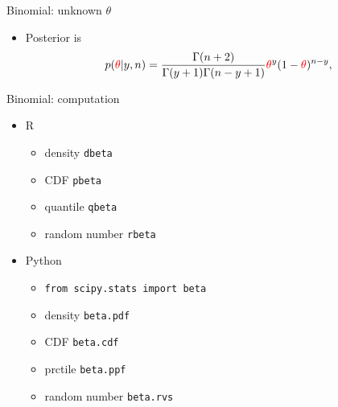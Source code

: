 \documentclass[english,t]{beamer}
\begin{document}

\begin{frame}{Binomial: unknown $\theta$}

  \begin{itemize}
  \item {\color{blue}Posterior} is
    \begin{align*}
      p({\color{red}\theta}|y,n) = \frac{\Gamma(n+2)}{\Gamma(y+1)\Gamma(n-y+1)}{\color{red}\theta}^y(1-{\color{red}\theta})^{n-y},
    \end{align*}
  \end{itemize}
  \begin{center}
  \end{center}
\end{frame}

\begin{frame}{Binomial: computation}

  \begin{itemize}
  \item R
    \begin{itemize}
    \item density {\tt dbeta}
    \item CDF {\tt pbeta}
    \item quantile {\tt qbeta}
    \item random number {\tt rbeta}
    \end{itemize}
  \item Python
    \begin{itemize}
    \item {\tt from scipy.stats import beta}
    \item density {\tt beta.pdf}
    \item CDF {\tt beta.cdf}
    \item prctile {\tt beta.ppf}
    \item random number {\tt beta.rvs}
    \end{itemize}
  \end{itemize}

\end{frame}
\end{document}
